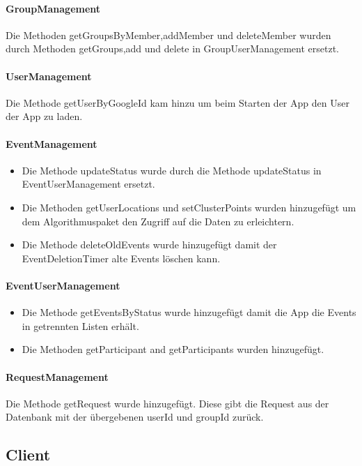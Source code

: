 \documentclass{scrartcl}
\begin{document}
	\paragraph{GroupManagement}	
	Die Methoden getGroupsByMember,addMember und deleteMember wurden durch Methoden getGroups,add und delete in GroupUserManagement ersetzt.
	\paragraph{UserManagement}	
	Die Methode getUserByGoogleId kam hinzu um beim Starten der App den User der App zu laden.
	\paragraph{EventManagement}	
	\begin{itemize}
\item 	Die Methode updateStatus wurde durch die Methode updateStatus in EventUserManagement ersetzt.
\item 	Die Methoden getUserLocations und setClusterPoints wurden hinzugefügt um dem Algorithmuspaket den Zugriff auf die Daten zu erleichtern.
\item	Die Methode deleteOldEvents wurde hinzugefügt damit der EventDeletionTimer alte Events löschen kann.	
	\end{itemize}

	\paragraph{EventUserManagement}		
	
	\begin{itemize}
\item 		Die Methode getEventsByStatus wurde hinzugefügt damit die App die Events in getrennten Listen erhält.
\item Die Methoden getParticipant and getParticipants wurden hinzugefügt.
	\end{itemize}

		\paragraph{RequestManagement}		
	Die Methode getRequest wurde hinzugefügt. Diese gibt die Request aus der Datenbank mit der übergebenen userId und groupId zurück.

\subsection{Client}
\end{document}
